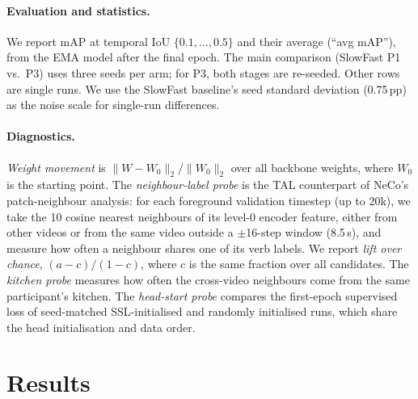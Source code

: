 \documentclass[10pt,a4paper]{article}
\newcommand{\pp}{\,pp}
\begin{document}
\paragraph{Evaluation and statistics.} We report mAP at temporal IoU
$\{0.1,\dots,0.5\}$ and their average (``avg mAP''), from the EMA model after the final
epoch. The main comparison (SlowFast P1 vs.\ P3) uses three seeds per arm; for P3, both
stages are re-seeded. Other rows are single runs. We use the SlowFast baseline's seed
standard deviation (0.75\pp) as the noise scale for single-run differences.

\paragraph{Diagnostics.} \emph{Weight movement} is
$\|W-W_0\|_2/\|W_0\|_2$ over all backbone weights, where $W_0$ is the starting point. The
\emph{neighbour-label probe} is the TAL counterpart of NeCo's patch-neighbour analysis:
for each foreground validation timestep (up to 20k), we take the 10 cosine nearest
neighbours of its level-0 encoder feature, either from other videos or from the same video
outside a $\pm$16-step window (8.5\,s), and measure how often a neighbour shares one of its
verb labels. We report \emph{lift over chance}, $(a-c)/(1-c)$, where $c$ is the same
fraction over all candidates. The \emph{kitchen probe} measures how often the cross-video
neighbours come from the same participant's kitchen. The \emph{head-start probe} compares
the first-epoch supervised loss of seed-matched SSL-initialised and randomly initialised
runs, which share the head initialisation and data order.

\section{Results}\label{sec:results}
\end{document}
